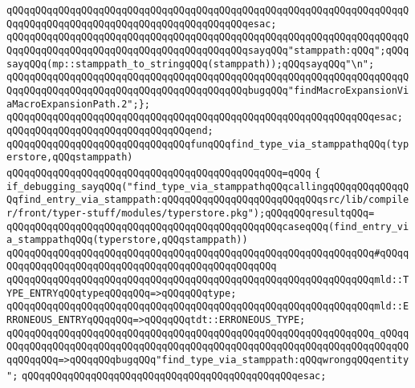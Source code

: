 \verb|qQQqqQQqqQQqqQQqqQQqqQQqqQQqqQQqqQQqqQQqqQQqqQQqqQQqqQQqqQQqqQQqqQQqqQQqqQQqqQQqqQQqqQQqqQQqqQQqqQQqqQQqqQQqqQQqesac;|\newline
\newline
\verb|qQQqqQQqqQQqqQQqqQQqqQQqqQQqqQQqqQQqqQQqqQQqqQQqqQQqqQQqqQQqqQQqqQQqqQQqqQQqqQQqqQQqqQQqqQQqqQQqqQQqqQQqqQQqqQQqsayqQQq"stamppath:qQQq";qQQqsayqQQq(mp::stamppath_to_stringqQQq(stamppath));qQQqsayqQQq"\n";|\newline
\verb|qQQqqQQqqQQqqQQqqQQqqQQqqQQqqQQqqQQqqQQqqQQqqQQqqQQqqQQqqQQqqQQqqQQqqQQqqQQqqQQqqQQqqQQqqQQqqQQqqQQqqQQqqQQqqQQqbugqQQq"findMacroExpansionViaMacroExpansionPath.2";};|\newline
\verb|qQQqqQQqqQQqqQQqqQQqqQQqqQQqqQQqqQQqqQQqqQQqqQQqqQQqqQQqqQQqqQQqesac;|\newline
\newline
\verb|qQQqqQQqqQQqqQQqqQQqqQQqqQQqqQQqend;|\newline
\newline
\verb|qQQqqQQqqQQqqQQqqQQqqQQqqQQqqQQqfunqQQqfind_type_via_stamppathqQQq(typerstore,qQQqstamppath)|\newline
\verb|qQQqqQQqqQQqqQQqqQQqqQQqqQQqqQQqqQQqqQQqqQQqqQQq=qQQq|\newline
\verb|{|\newline
\verb|if_debugging_sayqQQq("find_type_via_stamppathqQQqcallingqQQqqQQqqQQqqQQqfind_entry_via_stamppath:qQQqqQQqqQQqqQQqqQQqqQQqqQQqsrc/lib/compiler/front/typer-stuff/modules/typerstore.pkg");qQQqqQQqresultqQQq=|\newline
\newline
\verb|qQQqqQQqqQQqqQQqqQQqqQQqqQQqqQQqqQQqqQQqqQQqqQQqcaseqQQq(find_entry_via_stamppathqQQq(typerstore,qQQqstamppath))|\newline
\verb|qQQqqQQqqQQqqQQqqQQqqQQqqQQqqQQqqQQqqQQqqQQqqQQqqQQqqQQqqQQqqQQq#qQQqqQQqqQQqqQQqqQQqqQQqqQQqqQQqqQQqqQQqqQQqqQQqqQQq|\newline
\verb|qQQqqQQqqQQqqQQqqQQqqQQqqQQqqQQqqQQqqQQqqQQqqQQqqQQqqQQqqQQqqQQqmld::TYPE_ENTRYqQQqtypeqQQqqQQq=>qQQqqQQqtype;|\newline
\verb|qQQqqQQqqQQqqQQqqQQqqQQqqQQqqQQqqQQqqQQqqQQqqQQqqQQqqQQqqQQqqQQqmld::ERRONEOUS_ENTRYqQQqqQQq=>qQQqqQQqtdt::ERRONEOUS_TYPE;|\newline
\verb|qQQqqQQqqQQqqQQqqQQqqQQqqQQqqQQqqQQqqQQqqQQqqQQqqQQqqQQqqQQqqQQq_qQQqqQQqqQQqqQQqqQQqqQQqqQQqqQQqqQQqqQQqqQQqqQQqqQQqqQQqqQQqqQQqqQQqqQQqqQQqqQQqqQQq=>qQQqqQQqbugqQQq"find_type_via_stamppath:qQQqwrongqQQqentity";|\newline
\verb|qQQqqQQqqQQqqQQqqQQqqQQqqQQqqQQqqQQqqQQqqQQqqQQqesac;|\newline
